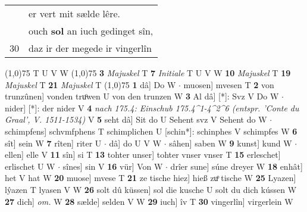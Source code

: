 \documentclass[8pt,a4paper,notitlepage]{article}
\begin{document}
\begin{table}[ht]
\begin{minipage}[t]{0.5\linewidth}
\begin{tabular}{rl}
 & er vert mit sælde lêre.\\ 
 & ouch \textbf{sol} an iuch gedinget sîn,\\ 
30 & daz ir der megede ir vingerlîn\\ 
\end{tabular}
\scriptsize
\line(1,0){75} \newline
T U V W \newline
\line(1,0){75} \newline
\textbf{3} \textit{Majuskel} T  \textbf{7} \textit{Initiale} T U V W  \textbf{10} \textit{Majuskel} T  \textbf{19} \textit{Majuskel} T  \textbf{21} \textit{Majuskel} T  \newline
\line(1,0){75} \newline
\textbf{1} dâ] Do W  $\cdot$ muosen] mvesen T \textbf{2} von trunzûnen] vonden truͦwen U von den trunzen W \textbf{3} Al dâ] [*]: Svz V Do W  $\cdot$ nider] [*]: der nider V \textbf{4} \textit{nach 175.4: Einschub 175.4\textasciicircum1-4\textasciicircum2\textasciicircum6 (entspr. 'Conte du Graal', V. 1511-1534)} V  \textbf{5} seht dâ] Sit do U Sehent svz V Sehent do W  $\cdot$ schimpfens] schvmfphens T schimplichen U [schin*]: schinphes V schimpfes W \textbf{6} sît] sein W \textbf{7} rîten] riter U  $\cdot$ dâ] do U V W  $\cdot$ sâhen] saben W \textbf{9} kunst] kund W  $\cdot$ ellen] elle V \textbf{11} sîn] si T \textbf{13} tohter unser] tohter vnser vnser T \textbf{15} erleschet] erlischet U W  $\cdot$ sînes] sin V \textbf{16} vür] Von W  $\cdot$ drîer sune] súne dreyer W \textbf{18} enhât] het V hat W \textbf{20} muose] mvese T \textbf{21} ze tische hiez] hieß zuͦ tische W \textbf{25} Lyazen] lŷazen T lyasen V W \textbf{26} solt dû küssen] sol die kusche U solt du dich kússen W \textbf{27} dich] \textit{om.} W \textbf{28} sælde] selden V W \textbf{29} iuch] îv T \textbf{30} vingerlîn] virgerlein W \newline
\end{minipage}
\end{table}
\end{document}
